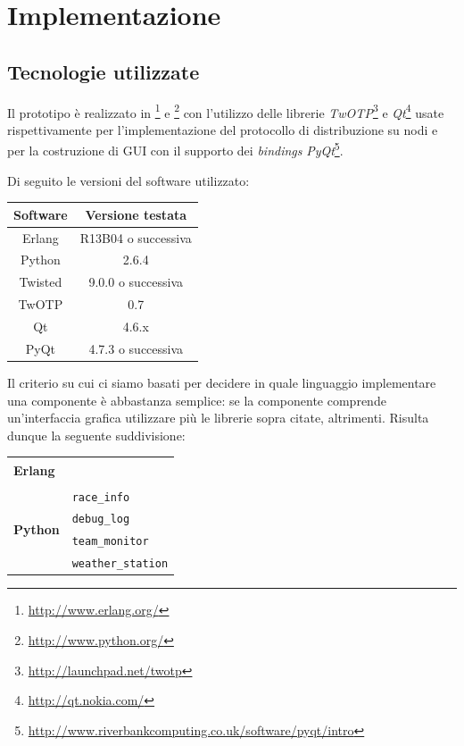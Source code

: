 \chapter{Implementazione}

\section{Tecnologie utilizzate}
Il prototipo è realizzato in \Erlang{}\footnote{\url{http://www.erlang.org/}} e \Python{}\footnote{\url{http://www.python.org/}} con l'utilizzo delle librerie \textsl{TwOTP}\footnote{\url{http://launchpad.net/twotp}} e \textsl{Qt}\footnote{\url{http://qt.nokia.com/}} usate rispettivamente per l'implementazione del protocollo di distribuzione \Erlang{} su nodi \Python{} e per la costruzione di GUI con il supporto dei \textit{bindings} \textsl{PyQt}\footnote{\url{http://www.riverbankcomputing.co.uk/software/pyqt/intro}}.

Di seguito le versioni del software utilizzato:
\begin{center}
\begin{tabular}{c|c}
\textbf{Software} & \textbf{Versione testata} \\
\hline
Erlang & R13B04 o successiva \\
\hline
Python & 2.6.4 \\
\hline
Twisted & 9.0.0 o successiva \\
TwOTP & 0.7 \\
\hline
Qt & 4.6.x \\
PyQt & 4.7.3 o successiva \\
\end{tabular}
\end{center}

Il criterio su cui ci siamo basati per decidere in quale linguaggio implementare una componente è abbastanza semplice: se la componente comprende un'interfaccia grafica utilizzare \Python{} più le librerie sopra citate, \Erlang{} altrimenti. Risulta dunque la seguente suddivisione:
\begin{center}
\begin{tabular}{|p{}|p{}|}
\hline
\multirow{6}{*}{\textbf{Erlang}} & \sched{}\\
& \evdisp{}\\
& \track{}\\
& \team{}\\
& \car{}\\
& \weather{}\\
\hline
\multirow{4}{*}{\textbf{Python}} & \texttt{race\_info}\\
& \texttt{debug\_log}\\
& \texttt{team\_monitor}\\
& \texttt{weather\_station}\\
\hline
\end{tabular}
\end{center}

